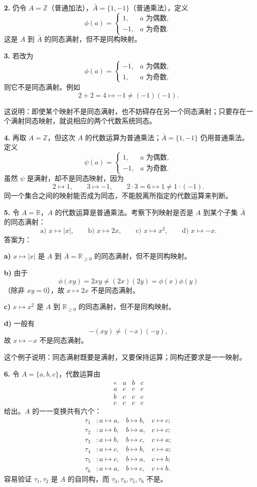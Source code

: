 \textbf{2.} 仍令 $A=\mathbb Z$（普通加法），$\bar A=\{1,-1\}$（普通乘法），定义
\[
\phi(a)=
\begin{cases}
1,&a\text{ 为偶数},\\
-1,&a\text{ 为奇数}.
\end{cases}
\]
这是 $A$ 到 $\bar A$ 的同态满射，但不是同构映射。

\textbf{3.} 若改为
\[
\phi(a)=
\begin{cases}
-1,&a\text{ 为偶数},\\
1,&a\text{ 为奇数},
\end{cases}
\]
则它不是同态满射。例如
\[
2+2=4\mapsto-1\ne(-1)(-1).
\]

这说明：即使某个映射不是同态满射，也不妨碍存在另一个同态满射；只要存在一个满射同态映射，就说相应的两个代数系统同态。

\textbf{4.} 再取 $A=\mathbb Z$，但这次 $A$ 的代数运算为普通乘法；$\bar A=\{1,-1\}$ 仍用普通乘法。定义
\[
\psi(a)=
\begin{cases}
1,&a\text{ 为偶数},\\
-1,&a\text{ 为奇数}.
\end{cases}
\]
虽然 $\psi$ 是满射，却不是同态映射，因为
\[
2\mapsto1,
\qquad 3\mapsto-1,
\qquad 2\cdot3=6\mapsto1\ne1\cdot(-1).
\]
同一个集合之间的映射能否成为同态，不能脱离所指定的代数运算来判断。

\textbf{5.} 令 $A=\mathbb R$，$A$ 的代数运算是普通乘法。考察下列映射是否是 $A$ 到某个子集 $\bar A$ 的同态满射：
\[
\text{a) }x\mapsto|x|,
\qquad
\text{b) }x\mapsto2x,
\qquad
\text{c) }x\mapsto x^2,
\qquad
\text{d) }x\mapsto-x.
\]
答案为：

\textbf{a)} $x\mapsto|x|$ 是 $A$ 到 $\bar A=\mathbb R_{\ge0}$ 的同态满射，但不是同构映射。

\textbf{b)} 由于
\[
\phi(xy)=2xy\ne(2x)(2y)=\phi(x)\phi(y)
\]
（除非 $xy=0$），故 $x\mapsto2x$ 不是同态满射。

\textbf{c)} $x\mapsto x^2$ 是 $A$ 到 $\mathbb R_{\ge0}$ 的同态满射，但不是同构映射。

\textbf{d)} 一般有
\[
-(xy)\ne(-x)(-y),
\]
故 $x\mapsto-x$ 不是同态满射。

这个例子说明：同态满射既要是满射，又要保持运算；同构还要求是一一映射。

\textbf{6.} 令 $A=\{a,b,c\}$，代数运算由
\[
\begin{array}{c|ccc}
\circ&a&b&c\\\hline
 a&c&c&c\\
 b&c&c&c\\
 c&c&c&c
\end{array}
\]
给出。$A$ 的一一变换共有六个：
\begin{align*}
\tau_1&:a\mapsto a,
&b\mapsto b,
&c\mapsto c;\\
\tau_2&:a\mapsto b,
&b\mapsto a,
&c\mapsto c;\\
\tau_3&:a\mapsto b,
&b\mapsto c,
&c\mapsto a;\\
\tau_4&:a\mapsto c,
&b\mapsto b,
&c\mapsto a;\\
\tau_5&:a\mapsto c,
&b\mapsto a,
&c\mapsto b;\\
\tau_6&:a\mapsto a,
&b\mapsto c,
&c\mapsto b.
\end{align*}
容易验证 $\tau_1,\tau_2$ 是 $A$ 的自同构，而 $\tau_3,\tau_4,\tau_5,\tau_6$ 不是。


